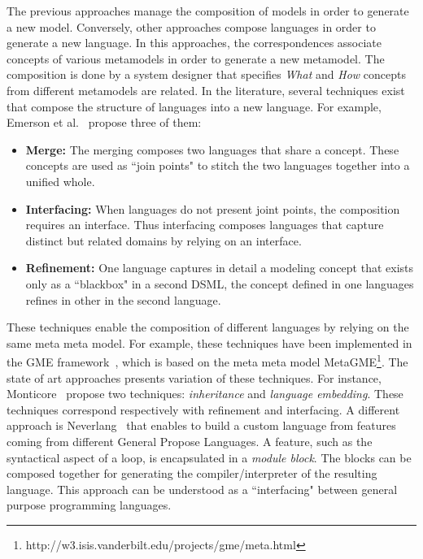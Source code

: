 
The previous approaches manage the composition of models in order to generate a new model. Conversely, other approaches compose languages in order to generate a new language. In this approaches, the correspondences associate concepts of various metamodels in order to generate a new metamodel. The composition is done by a system designer that specifies \emph{What} and \emph{How} concepts from different metamodels are related. In the literature, several techniques exist that compose the structure of languages into a new language. For example, Emerson et al.~\cite{metamodelcompo} propose three of them:
\begin{itemize}
	\item \textbf{Merge:} The merging composes two languages that share a concept. These concepts are used as ``join points" to stitch the two languages together into a unified whole.
	\item \textbf{Interfacing:} When languages do not present joint points, the composition requires an interface. Thus interfacing composes languages that capture distinct but related domains by relying on an interface.
	\item \textbf{Refinement:} One language captures in detail a modeling concept that exists only as a ``blackbox" in a second DSML, \ie the concept defined in one languages refines in other in the second language.
\end{itemize} 
These techniques enable the composition of different languages by relying on the same meta meta model. For example, these techniques have been implemented in the GME framework~\cite{metamodelcompo}, which is based on the meta meta model MetaGME\footnote{http://w3.isis.vanderbilt.edu/projects/gme/meta.html}. The state of art approaches presents variation of these techniques. For instance, Monticore~\cite{monticore} propose two techniques: \emph{inheritance} and \emph{language embedding}. These techniques correspond respectively with refinement and interfacing. A different approach is Neverlang~\cite{neverlang} that enables to build a custom language from features coming from different General Propose Languages. A feature, such as the syntactical aspect of a loop, is encapsulated in a \emph{module block}. The blocks can be composed together for generating the compiler/interpreter of the resulting language. This approach can be understood as a ``interfacing" between general purpose programming languages.

